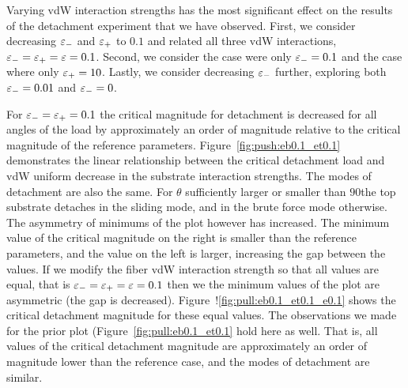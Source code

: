 Varying vdW interaction strengths has the most significant effect on the results of the detachment experiment that we have observed. First, we consider decreasing $\varepsilon_-$ and $\varepsilon_+$ to $0.1$ and related all three vdW interactions, $\varepsilon_- = \varepsilon_+ = \varepsilon = 0.1$. Second, we consider the case were only $\varepsilon_-=0.1$ and the case where only $\varepsilon_+=10$. Lastly, we consider decreasing $\varepsilon_-$ further, exploring both $\varepsilon_-=0.01$ and $\varepsilon_-=0$.

For $\varepsilon_- = \varepsilon_+ = 0.1$ the critical magnitude for detachment is decreased for all angles of the load by approximately an order of magnitude relative to the critical magnitude of the reference parameters. Figure~\ref{fig:push:eb0.1_et0.1} demonstrates the linear relationship between the critical detachment load and vdW uniform decrease in the substrate interaction strengths. The modes of detachment are also the same. For $\theta$ sufficiently larger or smaller than $90$\textdegree the top substrate detaches in the sliding mode, and in the brute force mode otherwise. The asymmetry of minimums of the plot however has increased. The minimum value of the critical magnitude on the right is smaller than the reference parameters, and the  value on the left is larger, increasing the gap between the values. If we modify the fiber vdW interaction strength so that all values are equal, that is $\varepsilon_- = \varepsilon_+ = \varepsilon = 0.1$ then we the minimum values of the plot are asymmetric (the gap is decreased). Figure~!\ref{fig:pull:eb0.1_et0.1_e0.1} shows the critical detachment magnitude for these equal values. The observations we made for the prior plot (Figure~\ref{fig:pull:eb0.1_et0.1} hold here as well. That is, all values of the critical detachment magnitude are approximately an order of magnitude lower than the reference case, and the modes of detachment are similar.


